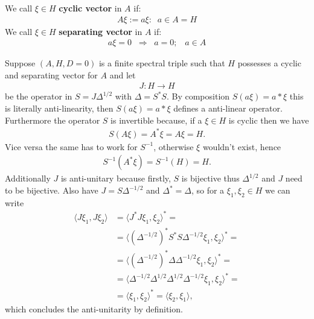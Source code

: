\begin{mydefinition}
    We call $\xi \in H$ \textbf{cyclic vector} in $A$ if:
    \begin{align}
        A\xi := { a\xi:\;\; a\in A} = H
    \end{align}
    We call $\xi \in H$ \textbf{separating vector} in $A$ if:
    \begin{align}
        a\xi = 0\;\; \Rightarrow \;\; a=0;\;\;\; a\in A
    \end{align}
\end{mydefinition}
Suppose $(A, H, D = 0)$ is a finite spectral triple such that $H$ possesses a
cyclic and separating vector for $A$ and let
\begin{align}
    J: H \rightarrow H
\end{align}
be the operator in $S = J \Delta ^{1/2}$ with $\Delta = S^*S$. By composition
$S(a\xi) = a*\xi$ this is literally anti-linearity, then $S(a \xi) = a* \xi$
defines a anti-linear operator. Furthermore the operator $S$ is invertible
because, if a $\xi \in H$ is cyclic then we have
\begin{align}
    S(A\xi) = A^*\xi = A\xi = H.
\end{align}
Vice versa the same has to work for $S^{-1}$, otherwise $\xi$ wouldn't exist,
hence
\begin{align}
    S^{-1}(A^*\xi) = S^{-1}(H) = H.
\end{align}
Additionally $J$ is anti-unitary because firstly, $S$ is bijective thus
$\Delta ^{1/2}$ and $J$ need to be bijective.  Also have $J = S
\Delta^{-1/2}$ and $\Delta^* = \Delta$, so for a $\xi _1 , \xi _2 \in H$ we
can write
\begin{align}
    \langle J \xi _1 , J \xi _2 \rangle  &= \langle  J^*J\xi_1 , \xi_2\rangle ^* =\nonumber\\
    &= \langle (\Delta ^{-1/2})^* S^* S \Delta ^{-1/2} \xi_1, \xi_2\rangle ^* =\nonumber \\
    &= \langle (\Delta^{-1/2})^* \Delta \Delta^{-1/2} \xi_1, \xi_2\rangle ^* =\nonumber\\
    &= \langle \Delta^{-1/2} \Delta^{1/2}\Delta^{1/2} \Delta^{-1/2} \xi_1, \xi_2\rangle ^*
    =\nonumber\\
    &= \langle \xi _1, \xi_2\rangle ^* = \langle \xi_2 , \xi_1\rangle ,
\end{align}
which concludes the anti-unitarity by definition.
